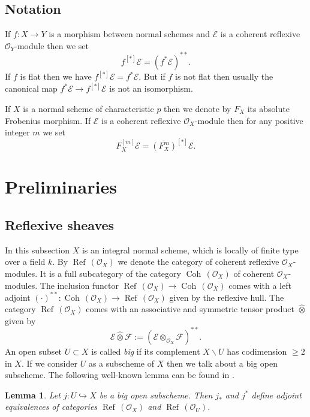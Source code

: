 \documentclass[12pt]{article}
\theoremstyle{plain}
\newtheorem{Lemma}[Thm]{\sc Lemma}
\theoremstyle{definition}
\theoremstyle{remark}
\newcommand{\cE}{{\mathcal E}}
\newcommand{\cF}{{\mathcal F}}
\newcommand{\cO}{{\mathcal O}}
\newcommand{\Coh}{{\mathop{\operatorname{Coh}\, }}}
\renewcommand{\Ref}{{\mathop{\operatorname{Ref}\, }}}
\begin{document}
\subsection*{Notation}

If $f: X\to Y$ is a morphism between normal schemes and $\cE$
is a coherent reflexive $\cO_Y$-module then we set
$$f^{[*]}\cE=(f^*\cE)^{**}.$$
If $f$ is flat then we have $f^{[*]}\cE= f^*\cE $.
But if $f$ is not flat then usually the canonical map $f^*\cE \to f^{[*]}\cE$ is not an isomorphism.

If $X$ is a normal scheme of characteristic $p$ then we denote by $F_X$ its absolute Frobenius morphism. If $\cE$ is a coherent reflexive $\cO_X$-module then for any positive integer $m$ we set
$$F_X^{[m]}\cE=(F_X^m)^{[*]}\cE .$$



\section{Preliminaries}

\subsection{Reflexive sheaves}\label{reflexive-sheaves}

In this subsection $X$ is an integral normal scheme, which is locally of finite type over a field $k$.
By  $\Ref(\cO_X)$  we denote the category of coherent reflexive $\cO_X$-modules. It is a full subcategory of the category $\Coh(\cO_X)$ of coherent  $\cO_X$-modules.  The inclusion functor $\Ref(\cO_X)\to \Coh (\cO_X)$ comes with a left adjoint $(\cdot )^{**}:\Coh(\cO_X)\to \Ref (\cO_X)$ given by the reflexive hull. The category $\Ref(\cO_X)$ 
comes with an associative and symmetric tensor product $\hat\otimes$ given by
$$\cE\hat\otimes \cF:=(\cE\otimes _{\cO_X} \cF)^{**}.$$
An open subset $U\subset X$ is called \emph{big}  if its complement $X\backslash U$  has codimension $\ge 2$ in $X$. If we consider $U$ as a subscheme of $X$ then we talk about a big open subscheme.
The following well-known lemma can be found in \cite[Lemma 0EBJ]{SP}.

\begin{Lemma}\label{restriction-to-open} 
	Let $j: U\hookrightarrow X $ be a big open subscheme.  Then  $j_*$ and $j^*$ define adjoint equivalences of categories $\Ref (\cO_X)$ and $\Ref(\cO_U)$. 
\end{Lemma}

\medskip
\end{document}
